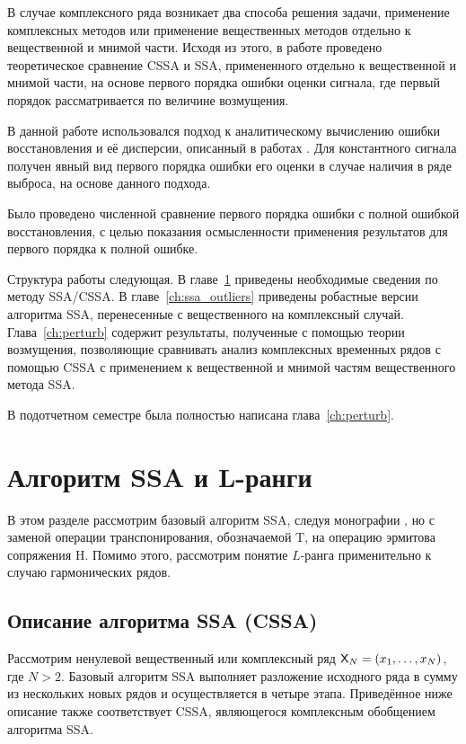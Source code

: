 \documentclass[specialist,
               substylefile = spbu.rtx,
               subf,href,colorlinks=true, 12pt]{disser}
\begin{document}
В случае комплексного ряда возникает два способа решения задачи, применение комплексных методов или применение вещественных методов отдельно к вещественной и мнимой части. Исходя из этого, в работе проведено теоретическое сравнение CSSA и SSA, примененного отдельно к вещественной и мнимой части, на основе первого порядка ошибки оценки сигнала, где первый порядок рассматривается по величине возмущения.

В данной работе использовался подход к аналитическому вычислению ошибки восстановления и её дисперсии, описанный в работах \cite{Nekr2008,Vlas2008}. Для константного сигнала получен явный вид первого порядка ошибки его оценки в случае наличия в ряде выброса, на основе данного подхода.

Было проведено численной сравнение первого порядка ошибки с полной ошибкой восстановления, с целью показания осмысленности применения результатов для первого порядка к полной ошибке.

Структура работы следующая. В главе~\ref{ch:ssa} приведены необходимые сведения по методу SSA/CSSA. В главе~\ref{ch:ssa_outliers} приведены робастные версии алгоритма SSA, перенесенные с вещественного на комплексный случай. Глава~\ref{ch:perturb} содержит результаты, полученные с помощью теории возмущения, позволяющие сравнивать анализ комплексных временных рядов с помощью CSSA с применением к вещественной и мнимой частям  вещественного метода SSA.

В подотчетном семестре была полностью написана глава~\ref{ch:perturb}. 

\chapter{Алгоритм SSA и L-ранги}
\label{ch:ssa}
В этом разделе рассмотрим базовый алгоритм SSA, следуя монографии \cite{Golyandina.etal2001}, но с заменой операции транспонирования, обозначаемой $\mathrm{T}$, на операцию эрмитова сопряжения $\mathrm{H}$. Помимо этого, рассмотрим понятие $L$-ранга применительно к случаю гармонических рядов.
\section{Описание алгоритма SSA (CSSA)}
Рассмотрим ненулевой вещественный или комплексный ряд $\textsf{X}_N = (x_1, \ldots, x_{N})$, где $N > 2$. Базовый алгоритм SSA выполняет разложение исходного ряда в сумму из нескольких новых рядов и осуществляется в четыре этапа. Приведённое ниже описание также соответствует CSSA, являющегося комплексным обобщением алгоритма SSA.
\end{document}
